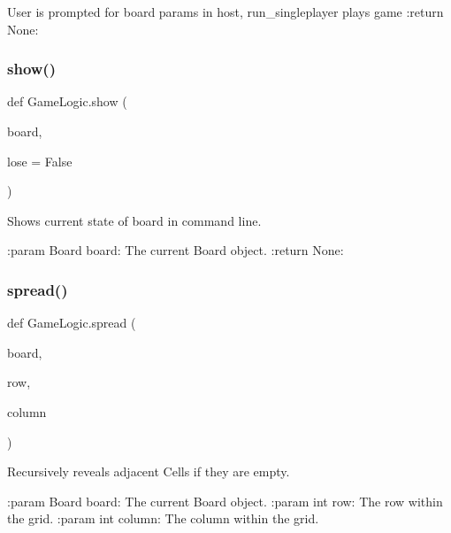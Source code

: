 \begin{DoxyVerb}User is prompted for board params in host,
run_singleplayer plays game
:return None:
\end{DoxyVerb}
 \mbox{\label{namespace_game_logic_afacbe6e69e6b939244d8c5f0aba5ff34}} 
\subsubsection{\texorpdfstring{show()}{show()}}
{\footnotesize\ttfamily def Game\+Logic.\+show (\begin{DoxyParamCaption}\item[{}]{board,  }\item[{}]{lose = {\ttfamily False} }\end{DoxyParamCaption})}

\begin{DoxyVerb}Shows current state of board in command line.

:param Board board: The current Board object.
:return None:
\end{DoxyVerb}
 \mbox{\label{namespace_game_logic_ae766be9cec703745c4f97f4f85a79dfc}} 
\subsubsection{\texorpdfstring{spread()}{spread()}}
{\footnotesize\ttfamily def Game\+Logic.\+spread (\begin{DoxyParamCaption}\item[{}]{board,  }\item[{}]{row,  }\item[{}]{column }\end{DoxyParamCaption})}

\begin{DoxyVerb}Recursively reveals adjacent Cells if they are empty.

:param Board board: The current Board object.
:param int row: The row within the grid.
:param int column: The column within the grid.
\end{DoxyVerb}
 